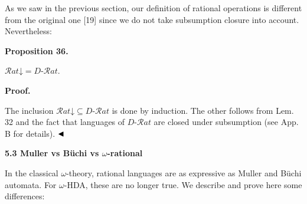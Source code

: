  
  
 
 
 
As we saw in the previous section, our definition of rational operations is different from the original one [19] since we do not take subsumption closure into account. Nevertheless:\par
 
 
 
\par\medskip\noindent\textbf{Proposition 36.}\par
 
 
$\mathcal{R}at\mathord{\downarrow}=D\text{-}\mathcal{R}at$.\par
 
 
 
 
 
\par\medskip\noindent\textbf{Proof.}\par
 
 
The inclusion $\mathcal{R}at\mathord{\downarrow}\subseteq D\text{-}\mathcal{R}at$ is done by induction. The other follows from Lem. 32 and the fact that languages of $D\text{-}\mathcal{R}at$ are closed under subsumption (see App. B for details). $\hfill\blacktriangleleft$\par
 
 
 
 
 
\par\medskip\noindent\textbf{5.3 Muller vs Büchi vs $\omega$-rational}\par
 
 
In the classical $\omega$-theory, rational languages are as expressive as Muller and Büchi automata. For $\omega$-HDA, these are no longer true. We describe and prove here some differences:\par
 
